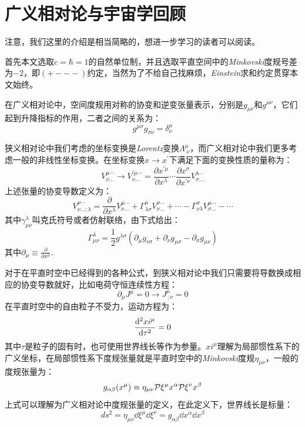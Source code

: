\documentclass{ctexart}
\newcommand{\dotemph}[1]{\CJKunderdot{#1}}
\begin{document}
	\section{广义相对论与宇宙学回顾}
	注意，我们这里的介绍是相当简略的，想进一步学习的读者可以阅读\cite{GR1}\cite{GR2}。
	
	首先本文选取$c=\hbar=1$的自然单位制，并且选取平直空间中的\textit{Minkovski}度规号差为$-2$，即$(+---)$约定，当然为了不给自己找麻烦，\textit{Einstein}求和约定贯穿本文始终。
	
	在广义相对论中，空间度规用对称的协变和逆变张量表示，分别是$g_{\mu\nu}$和$g^{\mu\nu}$，它们起到升降指标的作用，二者之间的关系为：
	\begin{equation}
		g^{\mu\sigma}g_{\sigma\nu}=\delta^\mu_\nu
	\end{equation}

	狭义相对论中我们考虑的坐标变换是\textit{Lorentz}变换$\Lambda^\mu_{\;\nu}$，而广义相对论中我们更多考虑一般的非线性坐标变换。在坐标变换$x\to x^\prime$下满足下面的变换性质的量称为\dotemph{张量}：
	\begin{equation}
		V^{\mu\cdots}_{\nu\dots}\to V^{\prime\mu\cdots}_{\nu\dots}=\frac{\partial x^{\prime\mu}}{\partial x^\lambda}\cdots\frac{\partial x^\sigma }{\partial x^{\prime \nu}}V^{\lambda\cdots}_{\sigma\dots}
	\end{equation}
	上述张量的协变导数定义为：
	\begin{equation}
		V^{\mu\cdots}_{\nu\dots;\lambda}=\frac{\partial }{\partial x^\lambda}V^{\mu\cdots}_{\nu\dots}+\Gamma^\mu_{\lambda\sigma}V^{\sigma\cdots}_{\nu\dots}+\cdots-\Gamma^\sigma_{\nu\lambda}V^{\mu\cdots}_{\sigma\dots}-\cdots
	\end{equation}
	其中$\gamma^\lambda_{\mu\nu}$叫克氏符号或者仿射联络，由下式给出：
	\begin{equation}
		\Gamma^\lambda_{\mu\nu}=\frac{1}{2}g^{\lambda\sigma}\left(\partial_\mu g_{\nu\sigma}+\partial_\nu g_{\mu\sigma}-\partial_\sigma g_{\mu\nu}\right)
	\end{equation}
	其中$\partial_{\mu}\equiv \frac{\partial }{\partial x^\mu}$.
	
	对于在平直时空中已经得到的各种公式，到狭义相对论中我们只需要将导数换成相应的协变导数就好，比如电荷守恒连续性方程：
	\begin{equation}
		\partial_\mu J^\mu=0\to J^\mu_{\, ; \nu}=0
	\end{equation}
	在平直时空中的自由粒子不受力，运动方程为：
	\begin{equation}
		\dv[2]{xi^\mu}{\tau}=0
	\end{equation}
	其中$\tau$是粒子的固有时，也可使用世界线长等作为参量。$xi^\mu$理解为局部惯性系下的广义坐标，在局部惯性系下度规张量就是平直时空中的\textit{Minkovski}度规$\eta_{\mu\nu}$，一般的度规张量为：
	\begin{equation}
		g_{\alpha\beta}(x^\mu)\equiv\eta_{\mu\nu}\pv{\xi^\mu}{x^\alpha}\pv{\xi^\nu}{x^\beta}
	\end{equation}
	上式可以理解为广义相对论中度规张量的定义，在此定义下，世界线长是标量：
	\begin{equation}
		ds^2=\eta_{\mu\nu}\dd \xi^{\mu}\dd \xi^{\nu}=g_{\alpha\beta}\dd x^\alpha \dd x^\beta
	\end{equation}
	
\end{document}
